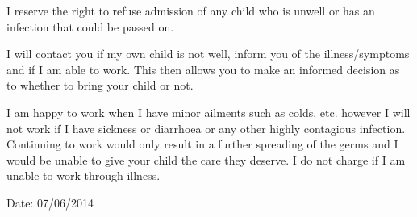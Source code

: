 \documentclass[10pt]{article}
\begin{document}
I reserve the right to refuse admission of any child who is unwell or
has an infection that could be passed on.

I will contact you if my own child is not well, inform you of the
illness/symptoms and if I am able to work. This then allows you to make
an informed decision as to whether to bring your child or not.

I am happy to work when I have minor ailments such as colds, etc.
however I will not work if I have sickness or diarrhoea or any other
highly contagious infection. Continuing to work would only result in a
further spreading of the germs and I would be unable to give your child
the care they deserve. I do not charge if I am unable to work through
illness.

Date: 07/06/2014
\end{document}
